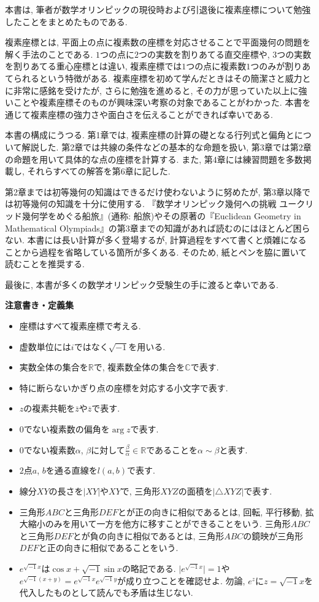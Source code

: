 本書は, 筆者が数学オリンピックの現役時および引退後に複素座標について勉強したことをまとめたものである.

複素座標とは, 平面上の点に複素数の座標を対応させることで平面幾何の問題を解く手法のことである.
$1$つの点に$2$つの実数を割りあてる直交座標や, $3$つの実数を割りあてる重心座標とは違い, 複素座標では$1$つの点に複素数$1$つのみが割りあてられるという特徴がある.
複素座標を初めて学んだときはその簡潔さと威力とに非常に感銘を受けたが, さらに勉強を進めると, その力が思っていた以上に強いことや複素座標そのものが興味深い考察の対象であることがわかった.
本書を通じて複素座標の強力さや面白さを伝えることができれば幸いである.

本書の構成にうつる.
第1章では, 複素座標の計算の礎となる行列式と偏角とについて解説した.
第2章では共線の条件などの基本的な命題を扱い, 第3章では第2章の命題を用いて具体的な点の座標を計算する.
また, 第4章には練習問題を多数掲載し, それらすべての解答を第6章に記した.

第2章までは初等幾何の知識はできるだけ使わないように努めたが, 第3章以降では初等幾何の知識を十分に使用する.
『数学オリンピック幾何への挑戦 ユークリッド幾何学をめぐる船旅』(通称: 船旅)やその原著の『Euclidean Geometry in Mathematical Olympiads』の第3章までの知識があれば読むのにはほとんど困らない.
本書には長い計算が多く登場するが, 計算過程をすべて書くと煩雑になることから過程を省略している箇所が多くある.
そのため, 紙とペンを脇に置いて読むことを推奨する.

最後に, 本書が多くの数学オリンピック受験生の手に渡ると幸いである.
%
\newpage
\begin{itembox}[l]{\textbf{注意書き・定義集}}
\begin{itemize}
\item 座標はすべて複素座標で考える.
\item 虚数単位には$i$ではなく$\sqrt{-1}$を用いる.
\item 実数全体の集合を$\mathbb{R}$で, 複素数全体の集合を$\mathbb{C}$で表す.
\item 特に断らないかぎり点の座標を対応する小文字で表す.
\item $z$の複素共軛を$\bar{z}$や$\overline{z}$で表す.
\item $0$でない複素数の偏角を$\arg z$で表す.
\item $0$でない複素数$\alpha$, $\beta$に対して$\frac\beta\alpha\in\mathbb{R}$であることを$\alpha\sim\beta$と表す.
\item $2$点$a$, $b$を通る直線を$l(a,b)$で表す.
\item 線分$XY$の長さを$\lvert XY\rvert$や$XY$で, 三角形$XYZ$の面積を$\lvert\triangle XYZ\rvert$で表す.
\item 三角形$ABC$と三角形$DEF$とが正の向きに相似であるとは, 回転, 平行移動, 拡大縮小のみを用いて一方を他方に移すことができることをいう.
三角形$ABC$と三角形$DEF$とが負の向きに相似であるとは, 三角形$ABC$の鏡映が三角形$DEF$と正の向きに相似であることをいう.
\item $e^{\sqrt{-1}x}$は$\cos x+\sqrt{-1}\sin x$の略記である. $\lvert e^{\sqrt{-1}x}\rvert=1$や$e^{\sqrt{-1}(x+y)}=e^{\sqrt{-1}x}e^{\sqrt{-1}y}$が成り立つことを確認せよ.
勿論, $e^z$に$z=\sqrt{-1}x$を代入したものとして読んでも矛盾は生じない.
\end{itemize}
\end{itembox}

